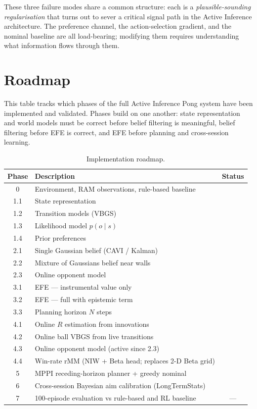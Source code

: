 \documentclass[12pt, a4paper]{article}
\newcommand{\1}{\mathbf{1}}
\newcommand{\yes}{\ding{51}}
\begin{document}
These three failure modes share a common structure: each is a
\textit{plausible-sounding regularisation} that turns out to sever a critical
signal path in the Active Inference architecture.  The preference channel, the
action-selection gradient, and the nominal baseline are all load-bearing;
modifying them requires understanding what information flows through them.

\section{Roadmap}
\label{sec:19}

This table tracks which phases of the full Active Inference Pong system have been
implemented and validated.  Phases build on one another: state representation and
world models must be correct before belief filtering is meaningful, belief
filtering before EFE is correct, and EFE before planning and cross-session
learning.

\begin{table}[ht]
\centering
\begin{tabular}{clc}
\toprule
Phase & Description & Status \\
\midrule
0   & Environment, RAM observations, rule-based baseline & \yes \\
1.1 & State representation & \yes \\
1.2 & Transition models (VBGS) & \yes \\
1.3 & Likelihood model $p(o\mid s)$ & \yes \\
1.4 & Prior preferences & \yes \\
2.1 & Single Gaussian belief (CAVI / Kalman) & \yes \\
2.2 & Mixture of Gaussians belief near walls & \yes \\
2.3 & Online opponent model & \yes \\
3.1 & EFE --- instrumental value only & \yes \\
3.2 & EFE --- full with epistemic term & \yes \\
3.3 & Planning horizon $N$ steps & \yes \\
4.1 & Online $R$ estimation from innovations & \yes \\
4.2 & Online ball VBGS from live transitions & \yes \\
4.3 & Online opponent model (active since 2.3) & \yes \\
4.4 & Win-rate rMM (NIW + Beta head; replaces 2-D Beta grid) & \yes \\
5   & MPPI receding-horizon planner + greedy nominal & \yes \\
6   & Cross-session Bayesian aim calibration (LongTermStats) & \yes \\
7   & 100-episode evaluation vs rule-based and RL baseline & --- \\
\bottomrule
\end{tabular}
\caption{Implementation roadmap.}
\end{table}

\end{document}
